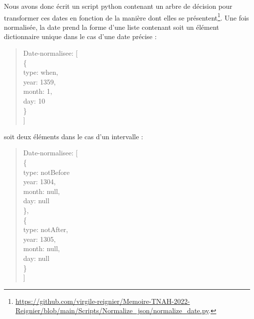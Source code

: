 \documentclass[a4paper,12pt,twoside]{book}
\begin{document}
	\noindent Nous avons donc écrit un script python contenant un arbre de décision pour transformer ces dates en fonction de la manière dont elles se présentent\footnote{	\url{https://github.com/virgile-reignier/Memoire-TNAH-2022-Reignier/blob/main/Scripts/Normalize_json/normalize_date.py}.}. Une fois normalisée, la date prend la forme d'une liste contenant soit un élément dictionnaire unique dans le cas d'une date précise :

	\begin{quotation}
		\textquotesingle Date-normalisee\textquotesingle: [\\
		\indent\indent\{\\
		\indent\indent	\textquotesingle type\textquotesingle: \textquotesingle when\textquotesingle,\\
		\indent\indent	\textquotesingle year\textquotesingle: 1359,\\
		\indent\indent	\textquotesingle month\textquotesingle : 1,\\
		\indent\indent	\textquotesingle day\textquotesingle : 10\\
		\indent\indent\}\\
		\indent ]\\
	\end{quotation}

	\pagebreak
	
	\noindent soit deux éléments dans le cas d'un intervalle :
	
	\begin{quotation}
				\textquotesingle Date-normalisee\textquotesingle : [\\
				\indent\indent		\{ \\
				\indent\indent		\textquotesingle type\textquotesingle : \textquotesingle notBefore\textquotesingle \\
				\indent\indent		\textquotesingle year\textquotesingle : 1304,\\
				\indent\indent		\textquotesingle month\textquotesingle : null,\\
				\indent\indent		\textquotesingle day\textquotesingle : null\\
				\indent\indent	\},\\
				\indent\indent	\{\\
				\indent\indent		\textquotesingle type\textquotesingle : \textquotesingle notAfter\textquotesingle ,\\
				\indent\indent		\textquotesingle year\textquotesingle : 1305,\\
				\indent\indent		\textquotesingle month\textquotesingle : null,\\
				\indent\indent		\textquotesingle day\textquotesingle : null\\
				\indent\indent	\}\\
				\indent	]\\
	\end{quotation}
	
\end{document}
